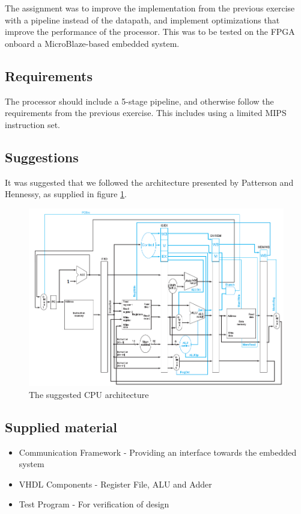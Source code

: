 The assignment was to improve the implementation from the previous exercise with
a pipeline instead of the datapath, and implement optimizations that improve the
performance of the processor. This was to be tested on the FPGA onboard a 
MicroBlaze-based embedded system.

\subsection{Requirements}
The processor should include a 5-stage pipeline, and otherwise follow the
requirements from the previous exercise. This includes using a limited MIPS
instruction set.

\subsection{Suggestions}
It was suggested that we followed the architecture presented by Patterson and
Hennessy, as supplied in figure \ref{fig:suggestedArchitecture}.

\begin{figure}[ht]
    \centering
    \includegraphics[width=\textwidth]{figures/SuggestedArchitecture.png}
    \caption{The suggested CPU architecture} 
    \label{fig:suggestedArchitecture}
\end{figure}


\subsection{Supplied material}
\begin{itemize}
\item Communication Framework -  Providing an interface towards the embedded system
\item VHDL Components - Register File, ALU and Adder
\item Test Program - For verification of design
\end{itemize}
